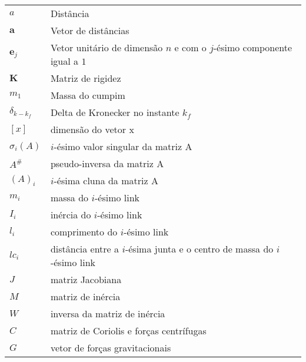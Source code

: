 \begin{xltabular}{\textwidth}{l X}
    $a$              & Distância                                                               \\
    $\textbf{a}$     & Vetor de distâncias                                                     \\
    $\textbf{e}_{j}$ & Vetor unitário de dimensão $n$ e com o $j$-ésimo componente igual a $1$ \\
    $\textbf{K}$     & Matriz de rigidez                                                       \\
    $m_1$            & Massa do cumpim                                                         \\
    $\delta_{k-k_f}$ & Delta de Kronecker no instante $k_f$                                    \\
    $[x]$            & dimensão do vetor x                                                     \\
    $\sigma_{i}(A)$  & $i$-ésimo valor singular da matriz A                                    \\
    $A^{\#}$         & pseudo-inversa da matriz A                                              \\
    $(A)_{i}$        & $i$-ésima cluna da matriz A                                             \\
    $m_{i}$          & massa do $i$-ésimo link                                                 \\
    $I_{i}$          & inércia do $i$-ésimo link                                               \\
    $l_{i}$          & comprimento do $i$-ésimo link                                           \\
    $lc_{i}$         & distância entre a $i$-ésima junta e o centro de massa do $i$-ésimo link \\
    $J$              & matriz Jacobiana                                                        \\
    $M$              & matriz de inércia                                                       \\
    $W$              & inversa da matriz de inércia                                            \\
    $C$              & matriz de Coriolis e forças centrífugas                                 \\
    $G$              & vetor de forças gravitacionais                                          \\

\end{xltabular}
